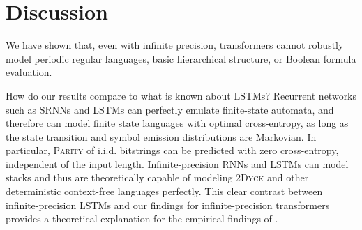 \documentclass[11pt,a4paper]{article}
\begin{document}



\section{Discussion}

We have shown that, even with infinite precision, transformers cannot robustly model periodic regular languages, basic hierarchical structure, or Boolean formula evaluation.

How do our results compare to what is known about LSTMs?
Recurrent networks such as SRNNs and LSTMs can perfectly emulate finite-state automata, and therefore can model finite state languages with optimal cross-entropy, as long as the state transition and symbol emission distributions are Markovian.
In particular, \textsc{Parity} of i.i.d. bitstrings can be predicted with zero cross-entropy, independent of the input length.
Infinite-precision RNNs and LSTMs can model stacks \cite{kirov2012processing} and thus are theoretically capable of modeling \textsc{2Dyck} and other deterministic context-free languages perfectly. %
This clear contrast between infinite-precision LSTMs and our findings for infinite-precision transformers provides a theoretical explanation for the empirical findings of \citet{tran2018importance}.





\end{document}
